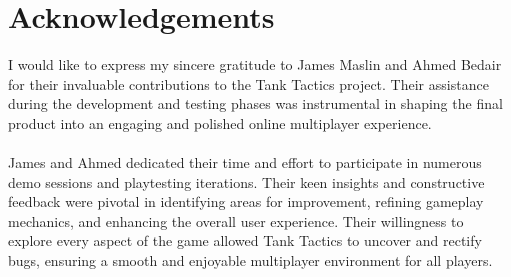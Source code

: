 \chapter*{\center \Large  Acknowledgements}
I would like to express my sincere gratitude to James Maslin and Ahmed Bedair for their invaluable contributions to the Tank Tactics project. Their assistance during the development and testing phases was instrumental in shaping the final product into an engaging and polished online multiplayer experience.
\\
\noindent
\\
James and Ahmed dedicated their time and effort to participate in numerous demo sessions and playtesting iterations. Their keen insights and constructive feedback were pivotal in identifying areas for improvement, refining gameplay mechanics, and enhancing the overall user experience. Their willingness to explore every aspect of the game allowed Tank Tactics to uncover and rectify bugs, ensuring a smooth and enjoyable multiplayer environment for all players.

